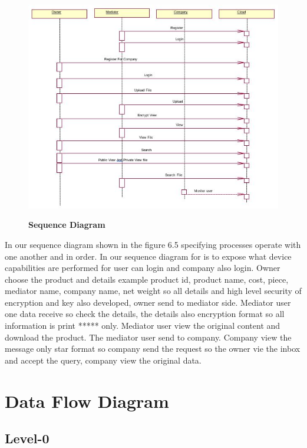 \documentclass[BTech]{srmuthesis}
\begin{document}
\begin{figure}[H]
\centering
\includegraphics[scale=0.9]{sequence.jpg}
\label{fig:1}\hspace{10mm}
\caption{\textbf{Sequence Diagram}}
\end{figure}
In our sequence diagram shown in the figure 6.5 specifying processes operate with one another and in order. In our sequence diagram for is to expose what device capabilities are performed for user can login and company also login. Owner choose the product and details example product id, product name, cost, piece, mediator name, company name, net weight so all details and high level security of encryption and key also developed,  owner  send to mediator side. Mediator user one data receive so check the details, the details also encryption format so all information is print ***** only. Mediator user view the original content and download the product. The mediator user send to company. Company view the message only star format so company send the request so the owner vie the inbox and accept the query, company view the original data.
\section{Data Flow Diagram}
\subsection{Level-0}
\end{document}
